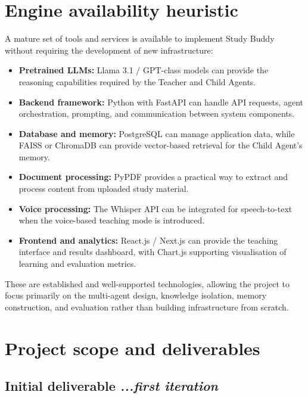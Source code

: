 \documentclass[11pt,a4paper]{article}
\newcommand{\mysection}[2]{%
    \section[#1]{#1 \hfill {\normalfont\itshape #2}}
}
\newcommand{\mysubsection}[2]{%
    \subsection[#1]{#1 \hfill {\normalfont\itshape #2}}
}
\begin{document}

\mysection{Engine availability heuristic}{}

A mature set of tools and services is available to implement Study Buddy without requiring the development of new infrastructure:

\begin{itemize}

    \item \textbf{Pretrained LLMs:} Llama 3.1 / GPT-class models can provide the reasoning capabilities required by the Teacher and Child Agents.

    \item \textbf{Backend framework:} Python with FastAPI can handle API requests, agent orchestration, prompting, and communication between system components.

    \item \textbf{Database and memory:} PostgreSQL can manage application data, while FAISS or ChromaDB can provide vector-based retrieval for the Child Agent's memory.

    \item \textbf{Document processing:} PyPDF provides a practical way to extract and process content from uploaded study material.

    \item \textbf{Voice processing:} The Whisper API can be integrated for speech-to-text when the voice-based teaching mode is introduced.

    \item \textbf{Frontend and analytics:} React.js / Next.js can provide the teaching interface and results dashboard, with Chart.js supporting visualisation of learning and evaluation metrics.

\end{itemize}

These are established and well-supported technologies, allowing the project to focus primarily on the multi-agent design, knowledge isolation, memory construction, and evaluation rather than building infrastructure from scratch.

\mysection{Project scope and deliverables}{}

\mysubsection{Initial deliverable}{...first iteration}
\end{document}

